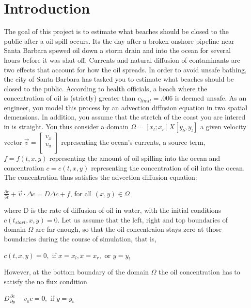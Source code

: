 \documentclass[12pt]{article}
\begin{document}
\section*{Introduction}\label{sec::Intro}
The goal of this project is to estimate what beaches should be closed to the public after a oil spill occurs.  Its the day after a broken onshore pipeline near Santa Barbara spewed oil down a storm drain and into the ocean for several hours before it was shut off. Currents and natural diffusion of contaminants are two effects that account for how the oil spreads. In order to avoid unsafe bathing, the city of Santa Barbara has tasked you to estimate what beaches should be closed to the public. According to health officials, a beach where the concentration of oil is (strictly) greater than $c_{limit} = .006$ is deemed unsafe.  As an engineer, you model this process by an advection diffusion equation in two spatial demensions.  In addition, you assume that the stretch of the coast you are intered in is straight.  You thus consider a domain $\Omega = [x_l;x_r] X [y_b,y_t]$ a given velocity vector $\overrightarrow{v} = \begin{bmatrix}
           v_x \\
          v_y \\
         \end{bmatrix}$ representing the ocean's currents, a source term, $f = f(t,x,y)$ representing the amount of oil spilling into the ocean and concentration $c = c(t,x,y)$ representing the concentration of oil into the ocean.  The concentration thus satisfies the advection diffusion equation:
\begin{center}
$ \frac{\partial c }{\partial t} + \overrightarrow{v} \cdot \Delta c = D \Delta c + f$, for all $(x,y) \in \Omega$ 
\end{center}
where D is the rate of diffusion of oil in water, with the initial conditions $c(t_{start},x, y) = 0$.  Let us assume that the left, right and top boundaries of domain $\Omega$ are far enough, so that the oil concentraion stays zero at those boundaries during the course of simulation, that is, 
\begin{center}
$c(t,x,y) = 0, $ if $x = x_l, x = x_r, $ or $ y = y_t$
\end{center}
However, at the bottom boundary of the domain $\Omega$ the oil concentration has to satisfy the no flux condition
\begin{center}
$D \frac{\partial c}{\partial y} - v_y c = 0, $ if $ y = y_b$
\end{center}
\end{document}
